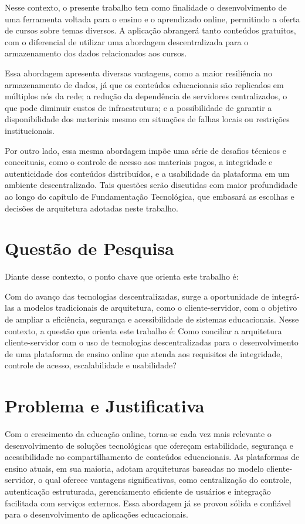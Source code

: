 Nesse contexto, o presente trabalho tem como finalidade o desenvolvimento de uma ferramenta voltada para o ensino e o aprendizado online, permitindo a oferta de cursos sobre temas diversos. A aplicação abrangerá tanto conteúdos gratuitos, com o diferencial de utilizar uma abordagem descentralizada para o armazenamento dos dados relacionados aos cursos.

Essa abordagem apresenta diversas vantagens, como a maior resiliência no armazenamento de dados, já que os conteúdos educacionais são replicados em múltiplos nós da rede; a redução da dependência de servidores centralizados, o que pode diminuir custos de infraestrutura; e a possibilidade de garantir a disponibilidade dos materiais mesmo em situações de falhas locais ou restrições institucionais.

Por outro lado, essa mesma abordagem impõe uma série de desafios técnicos e conceituais, como o controle de acesso aos materiais pagos, a integridade e autenticidade dos conteúdos distribuídos, e a usabilidade da plataforma em um ambiente descentralizado. Tais questões serão discutidas com maior profundidade ao longo do capítulo de Fundamentação Tecnológica, que embasará as escolhas e decisões de arquitetura adotadas neste trabalho.

\section{Questão de Pesquisa}
Diante desse contexto, o ponto chave que orienta este trabalho é:

Com do avanço das tecnologias descentralizadas, surge a oportunidade de integrá-las a modelos tradicionais de arquitetura, como o cliente-servidor, com o objetivo de ampliar a eficiência, segurança e acessibilidade de sistemas educacionais. Nesse contexto, a questão que orienta este trabalho é: Como conciliar a arquitetura cliente-servidor com o uso de tecnologias descentralizadas para o desenvolvimento de uma plataforma de ensino online que atenda aos requisitos de integridade, controle de acesso, escalabilidade e usabilidade?

\section{Problema e Justificativa}

Com o crescimento da educação online, torna-se cada vez mais relevante o desenvolvimento de soluções tecnológicas que ofereçam estabilidade, segurança e acessibilidade no compartilhamento de conteúdos educacionais. As plataformas de ensino atuais, em sua maioria, adotam arquiteturas baseadas no modelo cliente-servidor, o qual oferece vantagens significativas, como centralização do controle, autenticação estruturada, gerenciamento eficiente de usuários e integração facilitada com serviços externos. Essa abordagem já se provou sólida e confiável para o desenvolvimento de aplicações educacionais.


